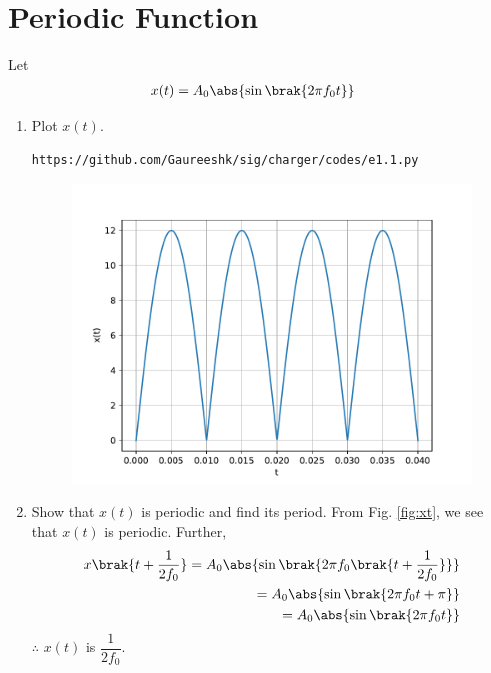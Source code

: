 \documentclass[journal,12pt,twocolumn]{IEEEtran}
\renewcommand\thesection{\arabic{section}}
\begin{document}
\section{Periodic Function}
Let 
\begin{align}
	x(t) &= A_0\abs{\sin\brak{2\pi f_0 t}}
	\label{eq:10-orig-diff-def}
\end{align}
\begin{enumerate}[label=\thesection.\arabic*
,ref=\thesection.\theenumi]
\item Plot $x(t)$.\\
\solution
\begin{lstlisting}
https://github.com/Gaureeshk/sig/charger/codes/e1.1.py
\end{lstlisting}
\begin{figure}[!ht]
	\begin{center}
		\includegraphics[width=\columnwidth]{./figs/e1.1.pdf}
	\end{center}
	\label{fig:xt}	
\end{figure}
\item Show that $x(t)$ is periodic and find its period.
\solution From Fig. \eqref{fig:xt}, we see that $x(t)$ is periodic. Further,
\begin{align}
	x\brak{t+\frac{1}{2f_0}} = A_0\abs{\sin\brak{2\pi f_0\brak{t + \frac{1}{2f_0}}}} \\
	= A_0\abs{\sin\brak{2\pi f_0t + \pi}} \\
	= A_0\abs{\sin\brak{2\pi f_0t}}
\end{align}
$\therefore$ $x(t)$ is $\dfrac{1}{2f_0}$.

\end{enumerate}
\end{document}
